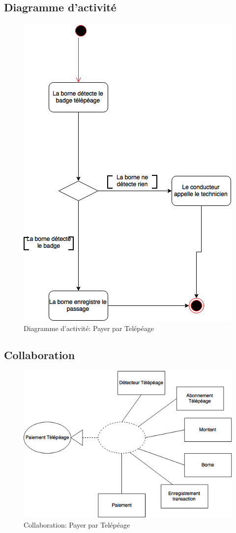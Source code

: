 \subsection{Diagramme d'activité}
\begin{figure}[h]
    \centering
    \includegraphics[scale=0.7]{02_Desenvolvimento/TD2/images/DATelepeage.png}
    \caption{Diagramme d'activité: Payer par Telépéage}
\end{figure}
\newpage
\subsection{Collaboration}
\begin{figure}[h]
    \centering
    \includegraphics[scale=0.6]{02_Desenvolvimento/TD2/images/ColaTelepeage.png}
    \caption{Collaboration: Payer par Telépéage}
\end{figure}
